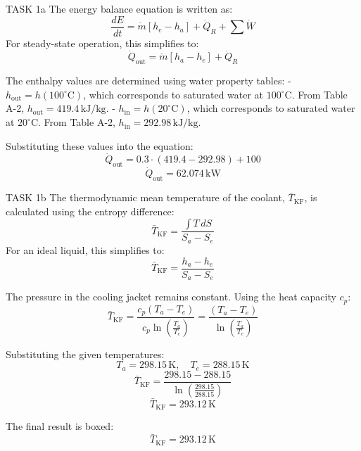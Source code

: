 TASK 1a  
The energy balance equation is written as:  
\[
\frac{dE}{dt} = \dot{m} \left[ h_e - h_a \right] + \dot{Q}_R + \sum \dot{W}
\]  
For steady-state operation, this simplifies to:  
\[
\dot{Q}_{\text{out}} = \dot{m} \left[ h_a - h_e \right] + \dot{Q}_R
\]  

The enthalpy values are determined using water property tables:  
- \( h_{\text{out}} = h(100^\circ\text{C}) \), which corresponds to saturated water at \( 100^\circ\text{C} \). From Table A-2, \( h_{\text{out}} = 419.4 \, \text{kJ/kg} \).  
- \( h_{\text{in}} = h(20^\circ\text{C}) \), which corresponds to saturated water at \( 20^\circ\text{C} \). From Table A-2, \( h_{\text{in}} = 292.98 \, \text{kJ/kg} \).  

Substituting these values into the equation:  
\[
\dot{Q}_{\text{out}} = 0.3 \cdot \left( 419.4 - 292.98 \right) + 100
\]  
\[
\dot{Q}_{\text{out}} = 62.074 \, \text{kW}
\]  

TASK 1b  
The thermodynamic mean temperature of the coolant, \( \bar{T}_{\text{KF}} \), is calculated using the entropy difference:  
\[
\bar{T}_{\text{KF}} = \frac{\int T \, dS}{S_a - S_e}
\]  
For an ideal liquid, this simplifies to:  
\[
\bar{T}_{\text{KF}} = \frac{h_a - h_e}{S_a - S_e}
\]  

The pressure in the cooling jacket remains constant. Using the heat capacity \( c_p \):  
\[
\bar{T}_{\text{KF}} = \frac{c_p (T_a - T_e)}{c_p \ln \left( \frac{T_a}{T_e} \right)} = \frac{(T_a - T_e)}{\ln \left( \frac{T_a}{T_e} \right)}
\]  

Substituting the given temperatures:  
\[
T_a = 298.15 \, \text{K}, \quad T_e = 288.15 \, \text{K}
\]  
\[
\bar{T}_{\text{KF}} = \frac{298.15 - 288.15}{\ln \left( \frac{298.15}{288.15} \right)}
\]  
\[
\bar{T}_{\text{KF}} = 293.12 \, \text{K}
\]  

The final result is boxed:  
\[
\boxed{\bar{T}_{\text{KF}} = 293.12 \, \text{K}}
\]